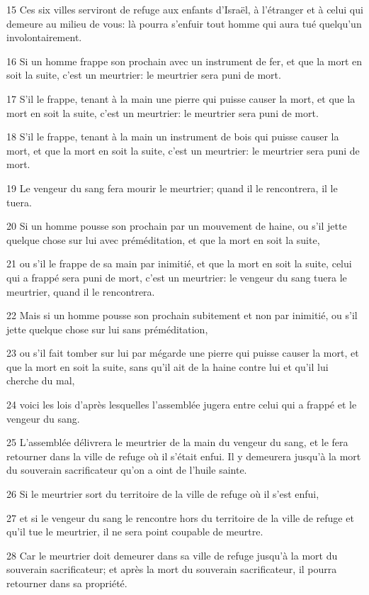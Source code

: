 \par 15 Ces six villes serviront de refuge aux enfants d'Israël, à l'étranger et à celui qui demeure au milieu de vous: là pourra s'enfuir tout homme qui aura tué quelqu'un involontairement.
\par 16 Si un homme frappe son prochain avec un instrument de fer, et que la mort en soit la suite, c'est un meurtrier: le meurtrier sera puni de mort.
\par 17 S'il le frappe, tenant à la main une pierre qui puisse causer la mort, et que la mort en soit la suite, c'est un meurtrier: le meurtrier sera puni de mort.
\par 18 S'il le frappe, tenant à la main un instrument de bois qui puisse causer la mort, et que la mort en soit la suite, c'est un meurtrier: le meurtrier sera puni de mort.
\par 19 Le vengeur du sang fera mourir le meurtrier; quand il le rencontrera, il le tuera.
\par 20 Si un homme pousse son prochain par un mouvement de haine, ou s'il jette quelque chose sur lui avec préméditation, et que la mort en soit la suite,
\par 21 ou s'il le frappe de sa main par inimitié, et que la mort en soit la suite, celui qui a frappé sera puni de mort, c'est un meurtrier: le vengeur du sang tuera le meurtrier, quand il le rencontrera.
\par 22 Mais si un homme pousse son prochain subitement et non par inimitié, ou s'il jette quelque chose sur lui sans préméditation,
\par 23 ou s'il fait tomber sur lui par mégarde une pierre qui puisse causer la mort, et que la mort en soit la suite, sans qu'il ait de la haine contre lui et qu'il lui cherche du mal,
\par 24 voici les lois d'après lesquelles l'assemblée jugera entre celui qui a frappé et le vengeur du sang.
\par 25 L'assemblée délivrera le meurtrier de la main du vengeur du sang, et le fera retourner dans la ville de refuge où il s'était enfui. Il y demeurera jusqu'à la mort du souverain sacrificateur qu'on a oint de l'huile sainte.
\par 26 Si le meurtrier sort du territoire de la ville de refuge où il s'est enfui,
\par 27 et si le vengeur du sang le rencontre hors du territoire de la ville de refuge et qu'il tue le meurtrier, il ne sera point coupable de meurtre.
\par 28 Car le meurtrier doit demeurer dans sa ville de refuge jusqu'à la mort du souverain sacrificateur; et après la mort du souverain sacrificateur, il pourra retourner dans sa propriété.
